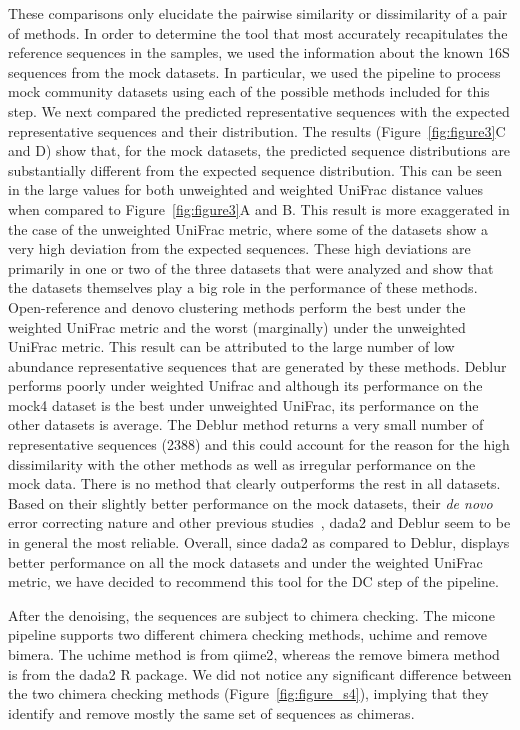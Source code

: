   These comparisons only elucidate the pairwise similarity or dissimilarity of a pair of methods.
  In order to determine the tool that most accurately recapitulates the reference sequences in the samples, we used the information about the known 16S sequences from the mock datasets.
  In particular, we used the pipeline to process mock community datasets using each of the possible methods included for this step.
  We next compared the predicted representative sequences with the expected representative sequences and their distribution.
  The results (Figure~\ref{fig:figure3}C and D) show that, for the mock datasets, the predicted sequence distributions are substantially different from the expected sequence distribution.
  This can be seen in the large values for both unweighted and weighted UniFrac distance values when compared to Figure~\ref{fig:figure3}A and B.
  This result is more exaggerated in the case of the unweighted UniFrac metric, where some of the datasets show a very high deviation from the expected sequences.
  These high deviations are primarily in one or two of the three datasets that were analyzed and show that the datasets themselves play a big role in the performance of these methods.
  Open-reference and denovo clustering methods perform the best under the weighted UniFrac metric and the worst (marginally) under the unweighted UniFrac metric.
  This result can be attributed to the large number of low abundance representative sequences that are generated by these methods.
  Deblur performs poorly under weighted Unifrac and although its performance on the mock4 dataset is the best under unweighted UniFrac, its performance on the other datasets is average.
  The Deblur method returns a very small number of representative sequences (2388) and this could account for the reason for the high dissimilarity with the other methods as well as irregular performance on the mock data.
  There is no method that clearly outperforms the rest in all datasets.
  Based on their slightly better performance on the mock datasets, their \textit{de novo} error correcting nature and other previous studies~\cite{Nearing2018}, \ac{dada2} and Deblur seem to be in general the most reliable.
  Overall, since \ac{dada2} as compared to Deblur, displays better performance on all the mock datasets and under the weighted UniFrac metric, we have decided to recommend this tool for the DC step of the pipeline.

  After the denoising, the sequences are subject to chimera checking.
  The \ac{micone} pipeline supports two different chimera checking methods, uchime and remove bimera.
  The uchime method is from \ac{qiime2}, whereas the remove bimera method is from the \ac{dada2} R package.
  We did not notice any significant difference between the two chimera checking methods (Figure~\ref{fig:figure_s4}), implying that they identify and remove mostly the same set of sequences as chimeras.

